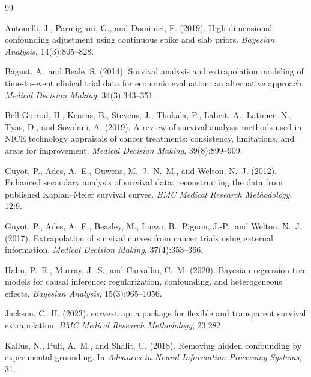 \documentclass[11pt]{article}
\begin{document}
\begin{thebibliography}{99}

Antonelli, J., Parmigiani, G., and Dominici, F. (2019).
\newblock High-dimensional confounding adjustment using continuous spike
and slab priors.
\newblock \emph{Bayesian Analysis}, 14(3):805--828.

Bagust, A.\ and Beale, S. (2014).
\newblock Survival analysis and extrapolation modeling of time-to-event
clinical trial data for economic evaluation: an alternative approach.
\newblock \emph{Medical Decision Making}, 34(3):343--351.

Bell Gorrod, H., Kearns, B., Stevens, J., Thokala, P., Labeit, A.,
Latimer, N., Tyas, D., and Sowdani, A. (2019).
\newblock A review of survival analysis methods used in NICE technology
appraisals of cancer treatments: consistency, limitations, and areas for
improvement.
\newblock \emph{Medical Decision Making}, 39(8):899--909.

Guyot, P., Ades, A.~E., Ouwens, M.~J.~N.~M., and Welton, N.~J. (2012).
\newblock Enhanced secondary analysis of survival data: reconstructing the
data from published Kaplan--Meier survival curves.
\newblock \emph{BMC Medical Research Methodology}, 12:9.

Guyot, P., Ades, A.~E., Beasley, M., Lueza, B., Pignon, J.-P., and
Welton, N.~J. (2017).
\newblock Extrapolation of survival curves from cancer trials using external
information.
\newblock \emph{Medical Decision Making}, 37(4):353--366.

Hahn, P.~R., Murray, J.~S., and Carvalho, C.~M. (2020).
\newblock Bayesian regression tree models for causal inference:
regularization, confounding, and heterogeneous effects.
\newblock \emph{Bayesian Analysis}, 15(3):965--1056.

Jackson, C.~H. (2023).
\newblock survextrap: a package for flexible and transparent survival
extrapolation.
\newblock \emph{BMC Medical Research Methodology}, 23:282.

Kallus, N., Puli, A.~M., and Shalit, U. (2018).
\newblock Removing hidden confounding by experimental grounding.
\newblock In \emph{Advances in Neural Information Processing Systems}, 31.


\end{thebibliography}
\end{document}
